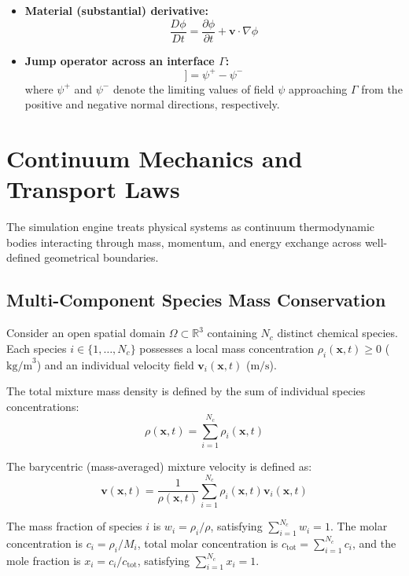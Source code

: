 \documentclass[11pt,a4paper]{article}
\begin{document}
\begin{itemize}[leftmargin=*]
\begin{equation}
    \end{equation}
    \item \textbf{Material (substantial) derivative:}
    \begin{equation}
    \frac{D\phi}{Dt} = \frac{\partial \phi}{\partial t} + \mathbf{v} \cdot \nabla \phi
    \end{equation}
    \item \textbf{Jump operator across an interface $\Gamma$:}
    \begin{equation}
    [\![\psi]\!] = \psi^+ - \psi^-
    \end{equation}
    where $\psi^+$ and $\psi^-$ denote the limiting values of field $\psi$ approaching $\Gamma$ from the positive and negative normal directions, respectively.
\end{itemize}

\section{Continuum Mechanics and Transport Laws}

The simulation engine treats physical systems as continuum thermodynamic bodies interacting through mass, momentum, and energy exchange across well-defined geometrical boundaries.

\subsection{Multi-Component Species Mass Conservation}

Consider an open spatial domain $\Omega \subset \mathbb{R}^3$ containing $N_c$ distinct chemical species. Each species $i \in \{1, \dots, N_c\}$ possesses a local mass concentration $\rho_i(\mathbf{x}, t) \ge 0$ ($\text{kg/m}^3$) and an individual velocity field $\mathbf{v}_i(\mathbf{x}, t)$ ($\text{m/s}$).

The total mixture mass density is defined by the sum of individual species concentrations:
\begin{equation}
\rho(\mathbf{x}, t) = \sum_{i=1}^{N_c} \rho_i(\mathbf{x}, t)
\end{equation}

The barycentric (mass-averaged) mixture velocity is defined as:
\begin{equation}
\mathbf{v}(\mathbf{x}, t) = \frac{1}{\rho(\mathbf{x}, t)} \sum_{i=1}^{N_c} \rho_i(\mathbf{x}, t) \mathbf{v}_i(\mathbf{x}, t)
\end{equation}

The mass fraction of species $i$ is $w_i = \rho_i / \rho$, satisfying $\sum_{i=1}^{N_c} w_i = 1$. The molar concentration is $c_i = \rho_i / M_i$, total molar concentration is $c_{\text{tot}} = \sum_{i=1}^{N_c} c_i$, and the mole fraction is $x_i = c_i / c_{\text{tot}}$, satisfying $\sum_{i=1}^{N_c} x_i = 1$.
\end{document}
